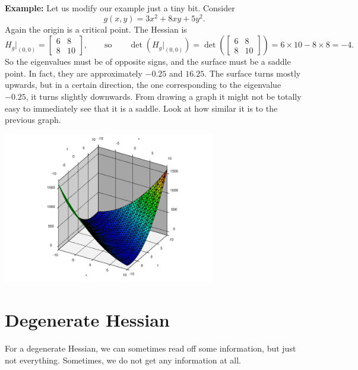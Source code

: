 \documentclass[12pt]{article}
\begin{document}
\bigskip

\pagebreak[2]
\textbf{Example:} Let us modify our example just a tiny bit.
Consider
$$
g(x,y) = 3 x^2 + 8xy  + 5y^2 .
$$
Again the origin is a critical point.
The Hessian is
$$
H_g\big|_{(0,0)} =
\begin{bmatrix}
6 & 8 \\
8 & 10
\end{bmatrix}
,
\qquad \text{so} \qquad
\det(H_g\big|_{(0,0)}) = 
\det \left(
\begin{bmatrix}
6 & 8 \\
8 & 10
\end{bmatrix}
\right)
=
6 \times 10 - 8 \times 8 = -4.
$$
So the eigenvalues must be of opposite signs, and the surface must be a
saddle point.  In fact, they are approximately $-0.25$ and $16.25$.
The surface turns mostly upwards, but in a certain direction, the one
corresponding to the eigenvalue $-0.25$, it turns
slightly downwards.  From drawing a graph it might not be totally easy to
immediately see that it is a saddle.  Look at how similar it is to the
previous graph.
\begin{center}
\includegraphics[width=3.65in]{mostly-upwards.pdf}
\end{center}

\bigskip

\section*{Degenerate Hessian}

For a degenerate Hessian, we can sometimes read off some information, but
just not everything.  Sometimes, we do not get any information at all.
\end{document}
